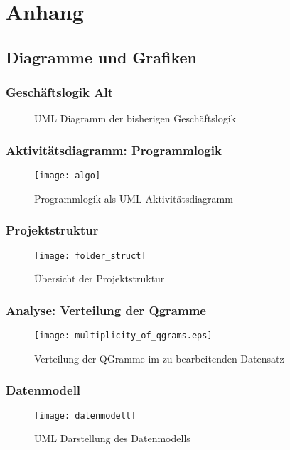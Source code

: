 \section{Anhang}
\subsection{Diagramme und Grafiken}

\subsubsection{Geschäftslogik Alt}
\begin{figure}
	\caption{UML Diagramm der bisherigen Geschäftslogik}
	\label{fig:businessLogicAlt}
\end{figure}



\subsubsection{Aktivitätsdiagramm: Programmlogik}
\begin{figure}[!htp]
	\caption{Programmlogik als UML Aktivitätsdiagramm}
	\label{fig:programmlogik}
	\texttt{[image: algo]}
	\centering
\end{figure}

\subsubsection{Projektstruktur}
\begin{figure}[!htp]
	\caption{Übersicht der Projektstruktur}
	\label{fig:folderstruct}
	\texttt{[image: folder\_struct]}
\end{figure}

\subsubsection{Analyse: Verteilung der Qgramme}
\begin{figure}[!htp]
    \caption{Verteilung der QGramme im zu bearbeitenden Datensatz}
    \label{fig:qgram_verteilung}
    \texttt{[image: multiplicity\_of\_qgrams.eps]}
    \centering
\end{figure}

\subsubsection{Datenmodell}
\begin{figure}[!htp]
    \caption{UML Darstellung des Datenmodells}
    \label{fig:datenmodell}
    \texttt{[image: datenmodell]}
    \centering
\end{figure}



